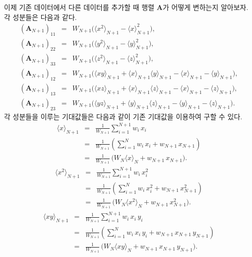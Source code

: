\documentclass[chapter,a4paper,12pt]{oblivoir}
\begin{document}
이제 기존 데이터에서 다른 데이터를 추가할 때 행렬 $\mathbf{A}$가 어떻게 변하는지 알아보자. 각 성분들은 다음과 같다.
\begin{eqnarray}
\left(\mathbf{A}_{N+1}\right)_{11} &=& W_{N+1}\Big(\langle x^2 \rangle_{N+1} -\langle x \rangle_{N+1}^2\Big), \\
\left(\mathbf{A}_{N+1}\right)_{22} &=& W_{N+1}\Big(\langle y^2 \rangle_{N+1} -\langle y \rangle_{N+1}^2\Big), \\
\left(\mathbf{A}_{N+1}\right)_{33} &=& W_{N+1}\Big(\langle z^2 \rangle_{N+1} -\langle z \rangle_{N+1}^2\Big), \\
\left(\mathbf{A}_{N+1}\right)_{12} &=& W_{N+1} \Big(\langle xy \rangle_{N+1} + \langle x \rangle_{N+1}\langle y \rangle_{N+1} - \langle x \rangle_{N+1} - \langle y \rangle_{N+1} \Big), \\
\left(\mathbf{A}_{N+1}\right)_{13} &=& W_{N+1} \Big(\langle xz \rangle_{N+1} + \langle x \rangle_{N+1}\langle z \rangle_{N+1} - \langle x \rangle_{N+1} - \langle z \rangle_{N+1} \Big), \\
\left(\mathbf{A}_{N+1}\right)_{23} &=& W_{N+1} \Big(\langle yz \rangle_{N+1} + \langle y \rangle_{N+1}\langle z \rangle_{N+1} - \langle y \rangle_{N+1} - \langle z \rangle_{N+1} \Big). 
\end{eqnarray}
각 성분들을 이루는 기대값들은 다음과 같이 기존 기대값을 이용하여 구할 수 있다.
\begin{eqnarray}
\langle x \rangle_{N+1} &=& \frac{1}{W_{N+1}}\sum_{i=1}^{N+1}w_i\,x_i \\
&=& \frac{1}{W_{N+1}}\left(\sum_{i=1}^{N}w_i\,x_i + w_{N+1}\,x_{N+1}\right)\nonumber\\
&=& \frac{1}{W_{N+1}}\,\Big(W_N\langle x \rangle_N + w_{N+1}\,x_{N+1}\Big).\nonumber
\end{eqnarray}
\begin{eqnarray}
\langle x^2 \rangle_{N+1} &=& \frac{1}{W_{N+1}}\sum_{i=1}^{N+1}w_i\,x_i^2 \\
&=& \frac{1}{W_{N+1}}\left(\sum_{i=1}^{N}w_i\,x_i^2 + w_{N+1}\,x_{N+1}^2\right)\nonumber\\
&=& \frac{1}{W_{N+1}}\,\Big(W_N\langle x^2 \rangle_N + w_{N+1}\,x_{N+1}^2\Big).\nonumber
\end{eqnarray}
\begin{eqnarray}
\langle xy \rangle_{N+1} &=& \frac{1}{W_{N+1}}\sum_{i=1}^{N+1}w_i\,x_i\,y_i \\
&=& \frac{1}{W_{N+1}}\left(\sum_{i=1}^{N}w_i\,x_i\,y_i + w_{N+1}\,x_{N+1}\,y_{N+1}\right)\nonumber\\
&=& \frac{1}{W_{N+1}}\,\Big(W_N\langle xy \rangle_N + w_{N+1}\,x_{N+1}\,y_{N+1}\Big).\nonumber
\end{eqnarray}
\end{document}
